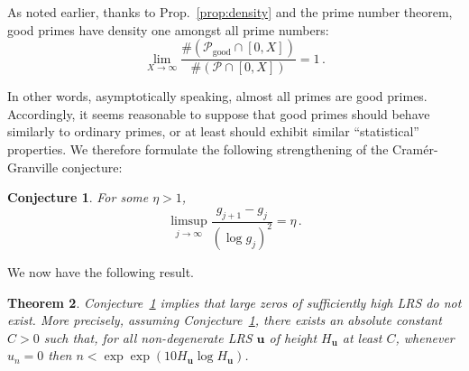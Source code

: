\documentclass[preprint,12pt]{elsarticle}
\newtheorem{theorem}{Theorem}[section]
\newtheorem{conjecture}[theorem]{Conjecture}
\begin{document}
As noted earlier, thanks to Prop.~\ref{prop:density} and the
prime number theorem, good primes have density one amongst all
prime numbers:
\[ \lim_{X \rightarrow \infty}
  \frac{\# \left(\mathcal{P}_{\mathrm{good}} \cap [0,X]\right)}{\#\left(\mathcal{P} \cap [0,X]\right)}
  = 1 \, .
  \]

  In other words, asymptotically speaking, almost all primes
  are good primes. Accordingly, it seems reasonable to suppose that
  good primes should behave similarly to ordinary primes, or at least
  should exhibit similar ``statistical'' properties. We therefore
  formulate the following strengthening of the Cram\'er-Granville conjecture:

\begin{conjecture}
  \label{conj:good}
  For some $\eta > 1$,
  \[
    \limsup_{j \rightarrow \infty} \frac{g_{j+1} - g_j}{(\log g_j)^2} =
    \eta \, .
\]    
\end{conjecture}

We now have the following result.

\begin{theorem}
  \label{thm:no-large-zeros}
Conjecture~\ref{conj:good} implies that large zeros of sufficiently
high LRS do not exist. More precisely, assuming
Conjecture~\ref{conj:good}, there exists an absolute constant $C>0$
such that, for all non-degenerate LRS $\mathbf{u}$ of height
$H_\mathbf{u}$ at least $C$, whenever $u_n = 0$ then
$n < \exp \exp(10 H_\mathbf{u} \log H_\mathbf{u})$.
\end{theorem}
\end{document}
